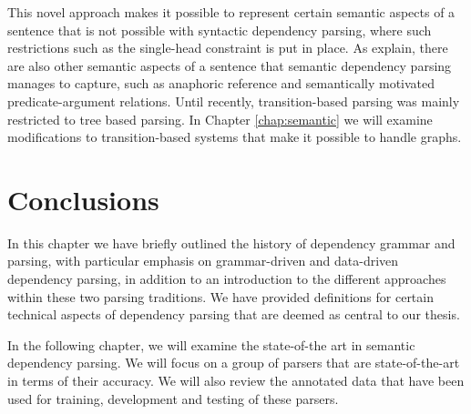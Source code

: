 This novel approach makes it possible to represent certain semantic aspects of a sentence that is not possible with syntactic dependency parsing, where such restrictions such as the single-head constraint is put in place. As  explain, there are also other semantic aspects of a sentence that semantic dependency parsing manages to capture, such as anaphoric reference and semantically motivated predicate-argument relations. Until recently, transition-based parsing was mainly restricted to tree based parsing. In Chapter \ref{chap:semantic} we will examine modifications to transition-based systems that make it possible to handle graphs.

\section{Conclusions}

In this chapter we have briefly outlined the history of dependency grammar and parsing, with particular emphasis on grammar-driven and data-driven dependency parsing, in addition to an introduction to the different approaches within these two parsing traditions. We have provided definitions for certain technical aspects of dependency parsing that are deemed as central to our thesis.

In the following chapter, we will examine the state-of-the art in semantic dependency parsing. We will focus on a group of parsers that  are state-of-the-art in terms of their accuracy. We will also review the annotated data that have been used for training, development and testing of these parsers.